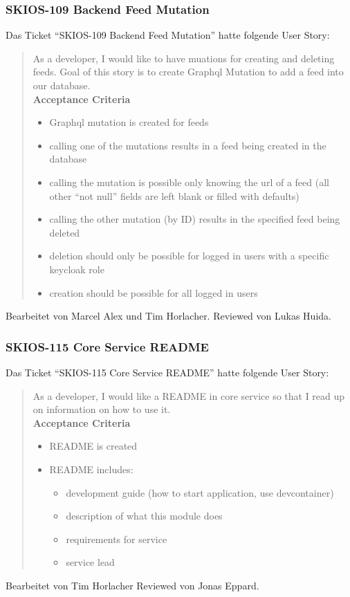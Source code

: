 \subsubsection{SKIOS-109 Backend Feed Mutation}
Das Ticket \enquote{SKIOS-109 Backend Feed Mutation} hatte folgende User Story:
\begin{quotation}
As a developer, I would like to have muations for creating and deleting feeds.
Goal of this story is to create Graphql Mutation to add a feed into our database.\\
\textbf{Acceptance Criteria}
\begin{itemize}
    \item Graphql mutation is created for feeds
    \item calling one of the mutations results in a feed being created in the database
    \item calling the mutation is possible only knowing the url of a feed (all other “not null” fields are left blank or filled with defaults)
    \item calling the other mutation (by ID) results in the specified feed being deleted
    \item deletion should only be possible for logged in users with a specific keycloak role
    \item creation should be possible for all logged in users
\end{itemize}
\end{quotation}
Bearbeitet von Marcel Alex und Tim Horlacher.
Reviewed von Lukas Huida.

\subsubsection{SKIOS-115 Core Service README}
Das Ticket \enquote{SKIOS-115 Core Service README} hatte folgende User Story:
\begin{quotation}
    As a developer, I would like a README in core service so that I read up on information on how to use it. \\
\textbf{Acceptance Criteria}
\begin{itemize}
    \item README is created
    \item README includes:
    \begin{itemize}
        \item development guide (how to start application, use devcontainer)
        \item description of what this module does
        \item requirements for service
        \item service lead
    \end{itemize}
\end{itemize}
\end{quotation}
Bearbeitet von Tim Horlacher
Reviewed von Jonas Eppard.

